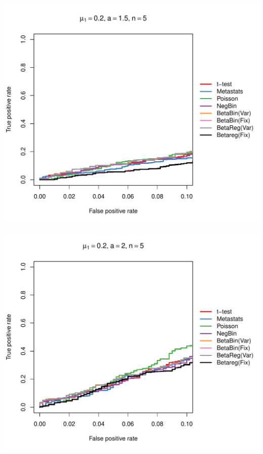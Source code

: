 \documentclass[12pt]{article}\usepackage{graphicx, color}
\makeatletter
\def\maxwidth{ %
  \ifdim\Gin@nat@width>\linewidth
    \linewidth
  \else
    \Gin@nat@width
  \fi
}
\newenvironment{knitrout}{}{} %
\makeatother
\begin{document}
\begin{knitrout}
{\centering \includegraphics[width=\maxwidth]{figure/rocs37} 

}




{\centering \includegraphics[width=\maxwidth]{figure/rocs38} 

}





\end{knitrout}
\end{document}
